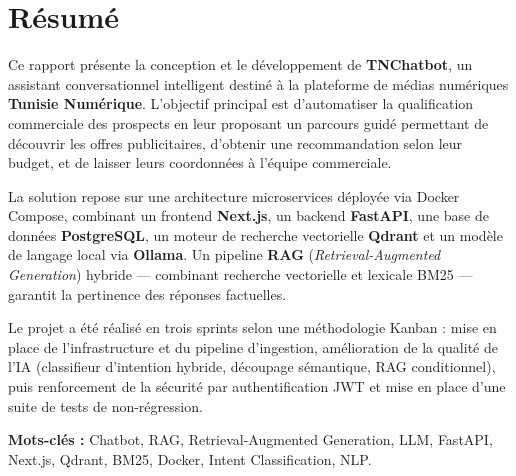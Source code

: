 \documentclass[12pt,a4paper]{report}
\begin{document}
\chapter*{Résumé}

Ce rapport présente la conception et le développement de \textbf{TNChatbot}, un assistant
conversationnel intelligent destiné à la plateforme de médias numériques \textbf{Tunisie
Numérique}. L'objectif principal est d'automatiser la qualification commerciale des prospects
en leur proposant un parcours guidé permettant de découvrir les offres publicitaires, d'obtenir
une recommandation selon leur budget, et de laisser leurs coordonnées à l'équipe commerciale.

La solution repose sur une architecture microservices déployée via Docker Compose,
combinant un frontend \textbf{Next.js}, un backend \textbf{FastAPI}, une base de données
\textbf{PostgreSQL}, un moteur de recherche vectorielle \textbf{Qdrant} et un modèle de
langage local via \textbf{Ollama}. Un pipeline \textbf{RAG} (\textit{Retrieval-Augmented
Generation}) hybride — combinant recherche vectorielle et lexicale BM25 — garantit la
pertinence des réponses factuelles.

Le projet a été réalisé en trois sprints selon une méthodologie Kanban : mise en place
de l'infrastructure et du pipeline d'ingestion, amélioration de la qualité de l'IA (classifieur
d'intention hybride, découpage sémantique, RAG conditionnel), puis renforcement de la
sécurité par authentification JWT et mise en place d'une suite de tests de non-régression.

\textbf{Mots-clés :} Chatbot, RAG, Retrieval-Augmented Generation, LLM, FastAPI,
Next.js, Qdrant, BM25, Docker, Intent Classification, NLP.

\tableofcontents
{}

\listoffigures
{}

\listoftables
{}
\end{document}
